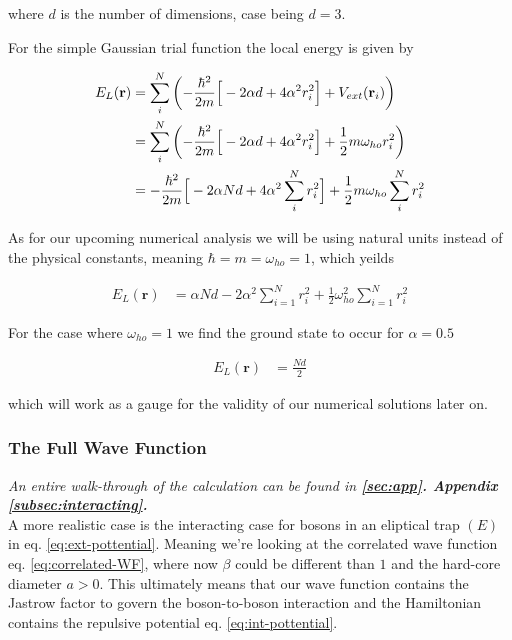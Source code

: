 where $d$ is the number of dimensions, case being $d=3$.

For the simple Gaussian trial function the local energy is given by

\begin{align}
    \begin{split}
        E_L(\mathbf{r}) &= \sum_i ^ N \left(-\frac{\hbar^2}{2m} \Big{[} -2\alpha d + 4\alpha^2 r_i^2 \Big{]} + V_{ext}(\mathbf{r}_i) \right) \\
        &= \sum_i ^ N \left(-\frac{\hbar^2}{2m} \Big{[} -2\alpha d + 4\alpha^2 r_i^2 \Big{]} +  \frac{1}{2}m\omega_{ho}r_i^2 \right) \\
        &= -\frac{\hbar^2}{2m}  \Big{[} -2\alpha Nd + 4\alpha^2 \sum_i ^ N r_i^2 \Big{]} +  \frac{1}{2}m\omega_{ho}\sum_i ^ N r_i^2
    \end{split}
    \label{eq:SG-local-energy}
\end{align}

As for our upcoming numerical analysis we will be using natural units instead of the physical constants, meaning $\hbar = m = \omega_{ho} =  1$, which yeilds

\begin{align}
    E_L(\mathbf{r}) &= \alpha Nd - 2\alpha^2\sum_{i=1}^N r_i^2 + \frac{1}{2}\omega^2_{ho}\sum_{i=1}^{N} r_i^2
\end{align}

For the case where $\omega_{ho}=1$ we find the ground state to occur for $\alpha = 0.5$

\begin{align}
    E_L(\mathbf{r}) &= \frac{Nd}{2}
    \label{eq:SG-ground-energy}
\end{align}

which will work as a gauge for the validity of our numerical solutions later on.

\subsubsection{The Full Wave Function}

\textit{An entire walk-through of the calculation can be found in \textbf{\ref{sec:app}. Appendix \ref{subsec:interacting}.}} \\

A more realistic case is the interacting case for bosons in an eliptical trap $(E)$ in eq. \ref{eq:ext-pottential}. Meaning we're looking at the correlated wave function eq. \ref{eq:correlated-WF}, where now $\beta$ could be different than $1$ and the hard-core diameter $a > 0$. This ultimately means that our wave function contains the Jastrow factor to govern the boson-to-boson interaction and the Hamiltonian contains the repulsive potential eq. \ref{eq:int-pottential}.

